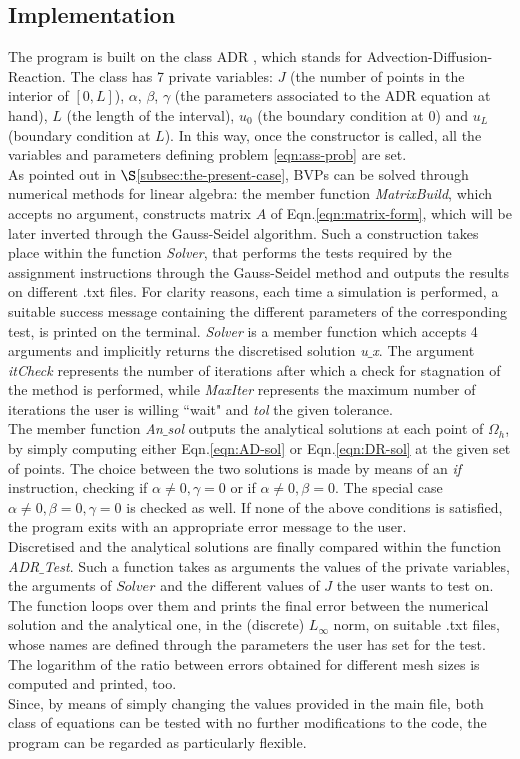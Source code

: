 \documentclass[11pt]{article}
\theoremstyle{theorem}
\theoremstyle{definition}
\begin{document}
\subsection{Implementation}
The program is built on the class ADR , which stands for Advection-Diffusion-Reaction. The class has 7 private variables: $J$ (the number of points in the interior of $[0,L]$), $\alpha$, $\beta$, $\gamma$ (the parameters associated to the ADR equation at hand), $L$ (the length of the interval), $u_0$ (the boundary condition at $0$) and $u_L$ (boundary condition at $L$). In this way, once the constructor is called, all the variables and parameters defining problem \eqref{eqn:ass-prob} are set.\\
As pointed out in $\S$\ref{subsec:the-present-case}, BVPs can be solved through numerical methods for linear algebra: the member function \emph{MatrixBuild}, which accepts no argument, constructs matrix $A$ of Eqn.\eqref{eqn:matrix-form}, which will be later inverted through the Gauss-Seidel algorithm. Such a construction takes place within the function \emph{Solver}, that performs the tests required by the assignment instructions through the Gauss-Seidel method and outputs the results on different .txt files. For clarity reasons,  each time a simulation is performed, a suitable success message containing the different parameters of the corresponding test, is printed on the terminal. \emph{Solver} is a member function which accepts 4 arguments and implicitly returns the discretised solution \emph{u$\_$x}. The argument \emph{itCheck} represents the number of iterations after which a check for stagnation of the method is performed, while \emph{MaxIter} represents the maximum number of iterations the user is willing ``wait" and \emph{tol} the given tolerance.\\ 
The member function \emph{An$\_$sol} outputs the analytical solutions at each point of $\Omega_h$, by simply computing either Eqn.\eqref{eqn:AD-sol} or Eqn.\eqref{eqn:DR-sol} at the given set of points. The choice between the two solutions is made by means of an \emph{if} instruction, checking if $\alpha\neq 0, \gamma=0$ or if $\alpha\neq 0, \beta=0$. The special case $\alpha\neq 0, \beta=0, \gamma=0$ is checked as well. If none of the above conditions is satisfied, the program exits with an appropriate error message to the user.\\
Discretised and the analytical solutions are finally compared within the function \emph{ADR$\_$Test}. Such a function takes as arguments the values of the private variables, the arguments of $Solver$ and the different values of $J$ the user wants to test on. The function loops over them and prints the final error between the numerical solution and the analytical one, in the (discrete) $L_\infty$ norm, on suitable .txt files, whose names are defined through the parameters the user has set for the test. The logarithm of the ratio between errors obtained for different mesh sizes is computed and printed, too.\\
Since, by means of simply changing the values provided in the main file, both class of equations can be tested with no further modifications to the code, the program can be regarded as particularly flexible.\\
\end{document}
